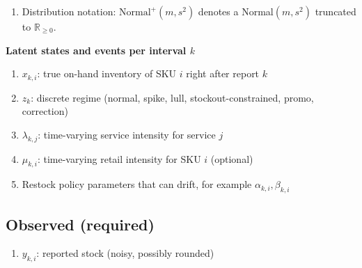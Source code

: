 \documentclass[11pt]{article}
\begin{document}
\begin{enumerate}
\begin{enumerate}
    \item \textbf{Lull:} unusually quiet interval. Typically decreases intensities and may also reduce dispersion (closer to Poisson-like behavior).

    \item \textbf{Stockout-constrained:} latent demand exists, but realized sales or usage are capped when inventory hits (or approaches) zero. In this regime, observed consumption is interpreted as \emph{censored} demand. The posterior favors trajectories with $\min_t x_i(t) \approx 0$ for at least one binding SKU.

    \item \textbf{Promo:} promotion period that shifts the service mix and/or usage recipes (e.g., different average inputs per service). Operationally this can mean shifted $\lambda_{k,j}$, different dispersions, and/or shifted recipe means $\mu^{\mathrm{use}}_{k,j,i}$.

    \item \textbf{Correction:} bookkeeping/measurement correction (late entry, recount, unit conversion, write-off). This regime increases the probability and/or scale of inventory corrections $A^{\mathrm{adj}}_{k,i}$ and can also inflate observation noise $\sigma_{\text{obs},i}$ for the affected interval.
  \end{enumerate}

  \item Distribution notation: $\text{Normal}^+(m,s^2)$ denotes a Normal$(m,s^2)$ truncated to $\mathbb{R}_{\ge 0}$.
\end{enumerate}

\textbf{Latent states and events per interval $k$}
\begin{enumerate}
  \item $x_{k,i}$: true on-hand inventory of SKU $i$ right after report $k$
  \item $z_k$: discrete regime (normal, spike, lull, stockout-constrained, promo, correction)
  \item $\lambda_{k,j}$: time-varying service intensity for service $j$
  \item $\mu_{k,i}$: time-varying retail intensity for SKU $i$ (optional)
  \item Restock policy parameters that can drift, for example $\alpha_{k,i}, \beta_{k,i}$
\end{enumerate}

\subsection*{Observed (required)}
\begin{enumerate}
  \item $y_{k,i}$: reported stock (noisy, possibly rounded)
\end{enumerate}
\end{document}
